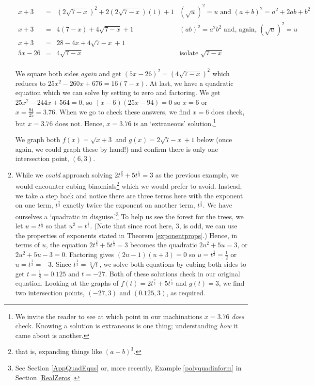 \begin{ex}
\begin{enumerate}
\[\begin{array}{rclr}
 x+3 & = & (2 \sqrt{7-x})^2 + 2 (2 \sqrt{7-x})(1) + 1 & \text{$(\sqrt{u})^2 = u$ and $(a+b)^2 = a^2 + 2ab +b^2$} \\

 
 x+3 & = & 4(7-x) + 4\sqrt{7-x} + 1 &  \text{$(ab)^2 = a^2b^2$ and, again, $(\sqrt{u})^2 = u$} \\
 
 x+3 & = & 28-4x+4\sqrt{7-x} + 1 & \\
 
 5x-26 & = & 4\sqrt{7-x} & \text{isolate $\sqrt{7-x}$} \\ \end{array} \]
 
We square both sides \textit{again} and get $(5x-26)^2 = (4\sqrt{7-x})^2$ which reduces to $25x^2-260x+676 = 16(7-x)$. At last, we have a quadratic equation which we can solve by setting to zero and factoring.  We get  $25x^2-244x+564 = 0$, so $(x-6)(25x-94) = 0$ so $x = 6$ or $x = \frac{94}{25} = 3.76$.  When we go to check these answers, we find $x=6$ does check, but $x = 3.76$ does not. Hence, $x=3.76$ is an `extraneous' solution.\footnote{We invite the reader to see at which point in our machinations $x=3.76$ \textit{does} check.  Knowing a solution is extraneous is one thing;  understanding \textit{how} it came about is another.}

We graph both $f(x) = \sqrt{x+3}$ and $g(x) = 2\sqrt{7-x} + 1$ below (once again, we could graph these by hand!) and confirm there is only one intersection point, $(6,3)$.

\item  While we \textit{could} approach solving  $2t^{\frac{2}{3}} + 5t^{\frac{1}{3}} = 3$ as the previous example, we would encounter cubing binomials\footnote{that is, expanding things like $(a+b)^3$.} which we would prefer to avoid.  Instead, we take a step back and notice there are three terms here with the exponent on one term, $t^{\frac{2}{3}}$ exactly twice the exponent on another term, $t^{\frac{1}{3}}$.  We have ourselves a `quadratic in disguise.'\footnote{See Section \ref{AppQuadEqus} or, more recently, Example \ref{polyquadinform} in Section \ref{RealZeros}.} To help us see the forest for the trees, we let $u = t^{\frac{1}{3}}$ so that $u^2 = t^{\frac{2}{3}}$. (Note that since root here, $3$, is odd, we can use the properties of exponents stated in Theorem \ref{exponentprops}.)  Hence, in terms of $u$, the equation   $2t^{\frac{2}{3}} + 5t^{\frac{1}{3}} = 3$ becomes the quadratic $2u^2 + 5u = 3$, or $2u^2 + 5u - 3 = 0$.  Factoring gives $(2u-1)(u+3) = 0$ so $u = t^{\frac{1}{3}} = \frac{1}{2}$ or $u = t^{\frac{1}{3}} = -3$.  Since $t^{\frac{1}{3}} = \sqrt[3]{t}$, we solve both equations by cubing both sides to get $t = \frac{1}{8} = 0.125$ and $t = -27$.  Both of these solutions check in our original equation.  Looking at the graphs of $f(t) = 2t^{\frac{2}{3}} + 5t^{\frac{1}{3}}$ and $g(t) = 3$, we find two intersection points, $(-27,3)$ and $(0.125,3)$, as required.


\end{enumerate}
\end{ex}
